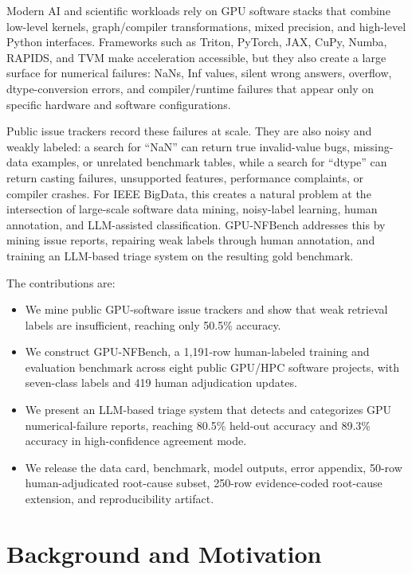 \documentclass[conference]{IEEEtran}
\newcommand{\bench}{GPU-NFBench}
\begin{document}
Modern AI and scientific workloads rely on GPU software stacks that combine
low-level kernels, graph/compiler transformations, mixed precision, and
high-level Python interfaces. Frameworks such as Triton, PyTorch, JAX, CuPy,
Numba, RAPIDS, and TVM make acceleration accessible, but they also create a
large surface for numerical failures: NaNs, Inf values, silent wrong answers,
overflow, dtype-conversion errors, and compiler/runtime failures that appear
only on specific hardware and software configurations.

Public issue trackers record these failures at scale. They are also noisy and
weakly labeled: a search for ``NaN'' can return true invalid-value bugs,
missing-data examples, or unrelated benchmark tables, while a search for
``dtype'' can return casting failures, unsupported features, performance
complaints, or compiler crashes. For IEEE BigData, this creates a natural
problem at the intersection of large-scale software data mining, noisy-label
learning, human annotation, and LLM-assisted classification. \bench{} addresses
this by mining issue reports, repairing weak labels through human annotation,
and training an LLM-based triage system on the resulting gold benchmark.

The contributions are:
\begin{itemize}
    \item We mine public GPU-software issue trackers and show that weak
    retrieval labels are insufficient, reaching only 50.5\% accuracy.
    \item We construct \bench{}, a 1,191-row human-labeled training and
    evaluation benchmark across eight public GPU/HPC software projects, with
    seven-class labels and 419 human adjudication updates.
    \item We present an LLM-based triage system that detects and categorizes
    GPU numerical-failure reports, reaching 80.5\% held-out accuracy and
    89.3\% accuracy in high-confidence agreement mode.
    \item We release the data card, benchmark, model outputs, error appendix,
    50-row human-adjudicated root-cause subset, 250-row evidence-coded
    root-cause extension, and reproducibility artifact.
\end{itemize}

\section{Background and Motivation}
\end{document}
